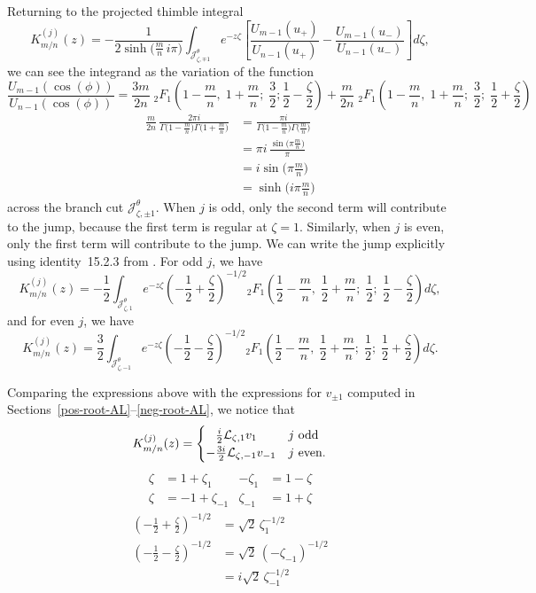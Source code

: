 \documentclass{article}
\newcommand{\laplace}{\mathcal{L}}
\theoremstyle{definition}
\theoremstyle{plain}
\newenvironment{verify}{\color{ForestGreen}}{\color{black}}
\begin{document}
Returning to the projected thimble integral
\[ K^{(j)}_{m/n}(z) = -\frac{1}{2\sinh\big(\tfrac{m}{n}\,i\pi\big)} \int_{\mathcal{J}^\theta_{\zeta, \mp 1}} e^{-z\zeta} \left[ \frac{U_{m-1}(u_+)}{U_{n-1}(u_+)} - \frac{U_{m-1}(u_-)}{U_{n-1}(u_-)} \right] d\zeta, \]
we can see the integrand as the variation of the function
\[ \frac{U_{m-1}(\cos(\phi))}{U_{n-1}(\cos(\phi))} = \frac{3m}{2n}\;{}_2F_1\left(1 - \frac{m}{n},\;1 + \frac{m}{n};\;\frac{3}{2};\frac{1}{2} - \frac{\zeta}{2}\right) + \frac{m}{2n}\;{}_2F_1\left(1 - \frac{m}{n},\;1 + \frac{m}{n};\;\frac{3}{2};\;\frac{1}{2} + \frac{\zeta}{2}\right) \]
\begin{verify}
\begin{align*}
\frac{m}{2n}\,\frac{2\pi i}{\Gamma\big(1-\tfrac{m}{n}\big)\Gamma\big(1+\tfrac{m}{n}\big)} & = \frac{\pi i}{\Gamma\big(1-\tfrac{m}{n}\big)\Gamma\big(\tfrac{m}{n}\big)} \\
& = \pi i\,\frac{\sin\big(\pi\tfrac{m}{n}\big)}{\pi} \\
& = i \sin\big(\pi\tfrac{m}{n}\big) \\
&= \sinh\big(i\pi\tfrac{m}{n}\big)
\end{align*}
\end{verify}
across the branch cut $\mathcal{J}^\theta_{\zeta, \pm 1}$. When $j$ is odd, only the second term will contribute to the jump, because the first term is regular at $\zeta = 1$. Similarly, when $j$ is even, only the first term will contribute to the jump. We can write the jump explicitly using identity~15.2.3 from \cite{dlmf}. For odd $j$, we have
\[ K^{(j)}_{m/n}(z) = -\frac{1}{2} \int_{\mathcal{J}^\theta_{\zeta, 1}} e^{-z\zeta} \left(-\frac{1}{2}+\frac{\zeta}{2}\right)^{-1/2} {}_2F_1\left(\frac{1}{2} - \frac{m}{n},\;\frac{1}{2} + \frac{m}{n};\;\frac{1}{2};\;\frac{1}{2} - \frac{\zeta}{2}\right) d\zeta, \]
and for even $j$, we have
\[ K^{(j)}_{m/n}(z) = \frac{3}{2} \int_{\mathcal{J}^\theta_{\zeta, -1}} e^{-z\zeta} \left(-\frac{1}{2}-\frac{\zeta}{2}\right)^{-1/2} {}_2F_1\left(\frac{1}{2} - \frac{m}{n},\;\frac{1}{2} + \frac{m}{n};\;\frac{1}{2};\;\frac{1}{2} + \frac{\zeta}{2}\right) d\zeta. \]

Comparing the expressions above with the expressions for $v_{\pm 1}$ computed in Sections~\ref{pos-root-AL}\;--\;\ref{neg-root-AL}, we notice that
\[ K^{(j)}_{m/n}(z) = \begin{cases}
\hphantom{-}\frac{i}{2}\laplace_{\zeta, 1} v_1 & j \text{ odd} \\
-\frac{3i}{2}\laplace_{\zeta, -1} v_{-1} & j \text{ even}.
\end{cases} \]
\begin{verify}
\begin{align*}
\zeta & = 1 + \zeta_1 & -\zeta_1 & = 1 - \zeta \\
\zeta & = -1 + \zeta_{-1} & \zeta_{-1} & = 1 + \zeta
\end{align*}
\begin{align*}
\left(-\frac{1}{2}+\frac{\zeta}{2}\right)^{-1/2} & = \sqrt{2}\,\zeta_1^{-1/2} \\
\left(-\frac{1}{2}-\frac{\zeta}{2}\right)^{-1/2} & = \sqrt{2}\,(-\zeta_{-1})^{-1/2} \\
& = i\sqrt{2}\,\zeta_{-1}^{-1/2}
\end{align*}
\end{verify}
\color{black}
%
\end{document}
